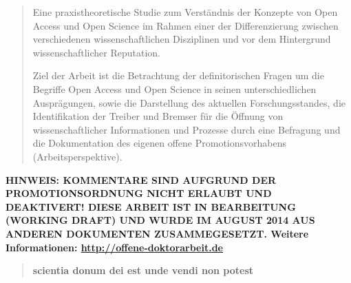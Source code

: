 
\begin{abstract}Eine praxistheoretische Studie zum Verständnis der Konzepte von Open Access und Open Science im Rahmen einer der Differenzierung zwischen verschiedenen wissenschaftlichen Disziplinen und vor dem Hintergrund wissenschaftlicher Reputation.

Ziel der Arbeit ist die Betrachtung der definitorischen Fragen um die Begriffe Open Access und Open Science in seinen unterschiedlichen Ausprägungen, sowie die Darstellung des aktuellen Forschungsstandes, die Identifikation der Treiber und Bremser für die Öffnung von wissenschaftlicher Informationen und Prozesse durch eine Befragung und die Dokumentation des eigenen offene Promotionsvorhabens (Arbeitsperspektive).
\end{abstract}

\textbf{HINWEIS: KOMMENTARE SIND AUFGRUND DER PROMOTIONSORDNUNG NICHT ERLAUBT UND DEAKTIVERT! DIESE ARBEIT IST IN BEARBEITUNG (WORKING DRAFT) UND WURDE IM AUGUST 2014 AUS ANDEREN DOKUMENTEN ZUSAMMEGESETZT.  Weitere Informationen: \href{http://offene-doktorarbeit.de}{http://offene-doktorarbeit.de}}

\begin{quote}
\textbf{scientia donum dei est unde vendi non potest}
\end{quote}
